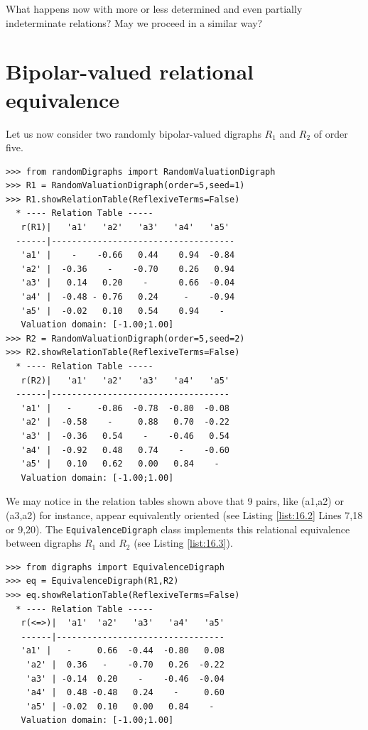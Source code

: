 What happens now with more or less determined and even partially indeterminate relations? May we proceed in a similar way?

\section{Bipolar-valued relational equivalence}
\label{sec:17.2}

Let us now consider two randomly bipolar-valued digraphs $R_1$ and $R_2$ of order five.

\begin{lstlisting}[caption={Two random bipolar-valued digraphs},label=list:16.2]
>>> from randomDigraphs import RandomValuationDigraph
>>> R1 = RandomValuationDigraph(order=5,seed=1)
>>> R1.showRelationTable(ReflexiveTerms=False)
  * ---- Relation Table -----
   r(R1)|   'a1'   'a2'   'a3'   'a4'   'a5'	  
  ------|------------------------------------
   'a1' |    - 	  -0.66	  0.44	  0.94	-0.84	 
   'a2' |  -0.36    - 	 -0.70	  0.26	 0.94	 
   'a3' |   0.14   0.20	   - 	  0.66	-0.04	 
   'a4' |  -0.48 - 0.76	  0.24	   -  	-0.94	 
   'a5' |  -0.02   0.10	  0.54	  0.94    - 	 
   Valuation domain: [-1.00;1.00]
>>> R2 = RandomValuationDigraph(order=5,seed=2)
>>> R2.showRelationTable(ReflexiveTerms=False)
  * ---- Relation Table -----
   r(R2)|   'a1'   'a2'   'a3'   'a4'   'a5'	  
  ------|-----------------------------------
   'a1' |   -     -0.86  -0.78  -0.80  -0.08	 
   'a2' |  -0.58    -     0.88   0.70  -0.22	 
   'a3' |  -0.36   0.54	   -    -0.46   0.54	 
   'a4' |  -0.92   0.48   0.74    -    -0.60	 
   'a5' |   0.10   0.62   0.00   0.84    - 	 
   Valuation domain: [-1.00;1.00]
\end{lstlisting}

We may notice in the relation tables shown above that 9 pairs, like (a1,a2) or (a3,a2) for instance, appear equivalently oriented (see Listing \ref{list:16.2} Lines 7,18 or 9,20). The \texttt{EquivalenceDigraph} class implements this relational equivalence between digraphs $R_1$ and $R_2$ (see Listing \ref{list:16.3}).
\begin{lstlisting}[caption={Bipolar-valued Equivalence Digraph},label=list:16.3]
>>> from digraphs import EquivalenceDigraph
>>> eq = EquivalenceDigraph(R1,R2)
>>> eq.showRelationTable(ReflexiveTerms=False)
  * ---- Relation Table -----
   r(<=>)|  'a1'  'a2'   'a3'   'a4'   'a5'	  
   ------|---------------------------------
   'a1' |   - 	  0.66  -0.44  -0.80   0.08	 
    'a2' |  0.36   -    -0.70   0.26  -0.22	 
    'a3' | -0.14  0.20    -    -0.46  -0.04	 
    'a4' |  0.48 -0.48   0.24    -     0.60	 
    'a5' | -0.02  0.10   0.00   0.84    - 	 
   Valuation domain: [-1.00;1.00]
\end{lstlisting}

